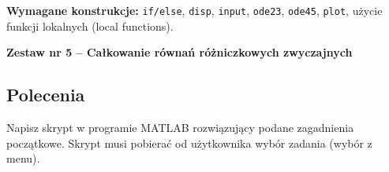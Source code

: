 \documentclass[a4paper,11pt]{article}
\begin{document}
\vspace{0.3cm}
\begin{ramka}
\textbf{Wymagane konstrukcje:}
\texttt{if/else}, \texttt{disp}, \texttt{input}, \texttt{ode23}, \texttt{ode45}, \texttt{plot}, użycie funkcji lokalnych (local functions).
\end{ramka}

\clearpage
\begin{center}
  {\large\bfseries Zestaw nr 5 \quad -- \quad Całkowanie równań różniczkowych zwyczajnych}
\end{center}
\hrulefill
\vspace{0.4cm}

\subsection*{Polecenia}

Napisz skrypt w programie MATLAB rozwiązujący podane zagadnienia początkowe. Skrypt musi pobierać od użytkownika wybór zadania (wybór z menu).
\end{document}
